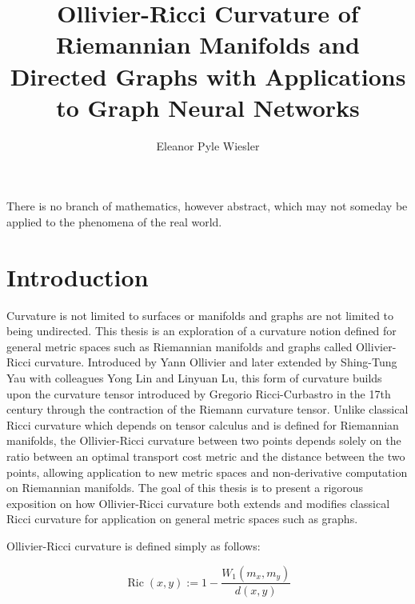 \documentclass{Dissertate}
\title{Ollivier-Ricci Curvature of Riemannian Manifolds and Directed Graphs with Applications to Graph Neural Networks}
\author{Eleanor Pyle Wiesler}
\theoremstyle{definition}
\theoremstyle{definition} %
\theoremstyle{definition}
\begin{document}


\leavevmode\frontmatter
\setstretch{\dnormalspacing}



\setcounter{chapter}{-1}  %
\begin{savequote}[90mm]
There is no branch of mathematics, however abstract, which may not someday be applied to the phenomena of the real world.
\end{savequote}

\chapter{Introduction}


Curvature is not limited to surfaces or manifolds and graphs are not limited to being undirected. This thesis is an exploration of a curvature notion defined for general metric spaces such as Riemannian manifolds and graphs called Ollivier-Ricci curvature. Introduced by Yann Ollivier and later extended by Shing-Tung Yau with colleagues Yong Lin and Linyuan Lu, this form of curvature builds upon the curvature tensor introduced by Gregorio Ricci-Curbastro in the 17th century through the contraction of the Riemann curvature tensor. Unlike classical Ricci curvature which depends on tensor calculus and is defined for Riemannian manifolds, the Ollivier-Ricci curvature between two points depends solely on the ratio between an optimal transport cost metric and the distance between the two points, allowing application to new metric spaces and non-derivative computation on Riemannian manifolds. The goal of this thesis is to present a rigorous exposition on how Ollivier-Ricci curvature both extends and modifies classical Ricci curvature for application on general metric spaces such as graphs.

Ollivier-Ricci curvature is defined simply as follows:

$$
\operatorname{Ric}(x,y) := 1 - \frac{W_1(m_x,m_y)}{d(x,y)}
$$
\end{document}
